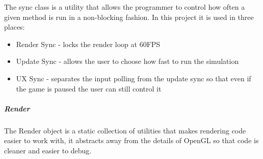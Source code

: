 			The sync class is a utility that allows the programmer to control how often a given method is run in a non-blocking fashion. In this project it is used in three places:
			
			\begin{itemize}
			\item Render Sync - locks the render loop at 60FPS
			
			\item Update Sync - allows the user to choose how fast to run the simulation
			
			\item UX Sync - separates the input polling from the update sync so that even if the game is paused the user can still control it
		\end{itemize}
		
		\subparagraph{Render} 
		
			The Render object is a static collection of utilities that makes rendering code easier to work with, it abstracts away from the details of OpenGL so that code is cleaner and easier to debug.
	